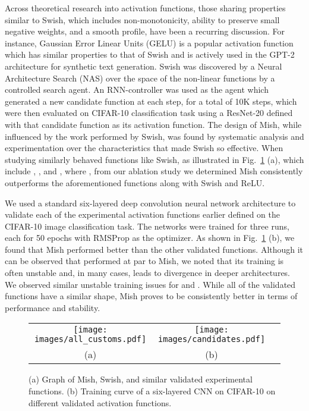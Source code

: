 \documentclass{bmvc2k}
\begin{document}
Across theoretical research into activation functions, those sharing properties similar to Swish, which includes non-monotonicity, ability to preserve small negative weights, and a smooth profile, have been a recurring discussion. For instance, Gaussian Error Linear Units (GELU) \cite{hendrycks2016gaussian} is a popular activation function which has similar properties to that of Swish and is actively used in the GPT-2 architecture \cite{radford2019language} for synthetic text generation. Swish was discovered by a Neural Architecture Search (NAS) \cite{zoph2016neural} over the space of the non-linear functions by a controlled search agent. An RNN-controller was used as the agent which generated a new candidate function at each step, for a total of 10K steps, which were then evaluated on CIFAR-10 classification task using a ResNet-20 defined with that candidate function as its activation function. The design of Mish, while influenced by the work performed by Swish, was found by systematic analysis and experimentation over the characteristics that made Swish so effective. When studying similarly behaved functions like Swish, as illustrated in Fig.~\ref{fig:candidates} (a), which include , ,  and , where , from our ablation study we determined Mish consistently outperforms the aforementioned functions along with Swish and ReLU.

We used a standard six-layered deep convolution neural network architecture to validate each of the experimental activation functions earlier defined on the CIFAR-10 image classification task. The networks were trained for three runs, each for 50 epochs with RMSProp as the optimizer. As shown in Fig.~\ref{fig:candidates} (b), we found that Mish performed better than the other validated functions. Although it can be observed that  performed at par to Mish, we noted that its training is often unstable and, in many cases, leads to divergence in deeper architectures. We observed similar unstable training issues for  and . While all of the validated functions have a similar shape, Mish proves to be consistently better in terms of performance and stability. 

\begin{figure}
	\centering
	\begin{tabular}{ccc}
		\texttt{[image: images/all\_customs.pdf]}&
		\texttt{[image: images/candidates.pdf]}\\
		(a)&(b)
	\end{tabular}
	\caption{(a) Graph of Mish, Swish, and similar validated experimental functions. (b) Training curve of a six-layered CNN on CIFAR-10 on different validated activation functions.}
	\label{fig:candidates}
\end{figure}
\end{document}
